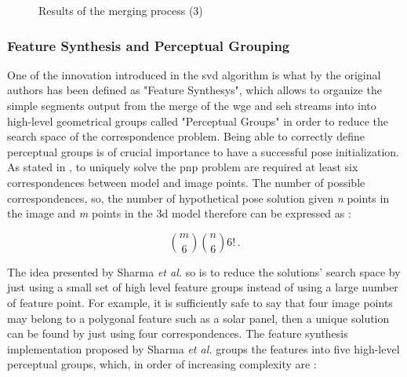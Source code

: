\begin{figure}[htbp]
  \qquad
  \qquad
  \caption{Results of the merging process (3)}
  \label{fig:mergeStreams3}
\end{figure}

\subsubsection{Feature Synthesis and Perceptual Grouping}
One of the innovation introduced in the \acrshort{svd} algorithm is what by the original authors has been defined as "Feature Synthesys", which allows to organize the simple segments output from the merge of the \acrshort{wge} and \acrshort{seh} streams into into high-level geometrical groups called "Perceptual Groups" in order to reduce the search space of the correspondence problem. Being able to correctly define perceptual groups is of crucial importance to have a successful pose initialization.
As stated in \cite{10.1145/358669.358692}, to uniquely solve the \acrshort{pnp} problem are required at least six correspondences between model and image points. The number of possible correspondences, so, the number of hypothetical pose solution given \textit{n} points in the image and \textit{m} points in the \acrshort{3d} model therefore can be expressed as \cite{Sharma2018}:

\begin{equation*}
  \binom{m}{6} \binom{n}{6} 6! \,.
\end{equation*}

The idea presented by Sharma \textit{et al.} so is to reduce the solutions' search space by just using a small set of high level feature groups instead of using a large number of feature point. For example, it is sufficiently safe to say that four image points may belong to a polygonal feature such as a solar panel, then a unique solution can be found by just using four correspondences. The feature synthesis implementation proposed by Sharma \textit{et al.} groups the features into five high-level perceptual groups, which, in order of increasing complexity are :

